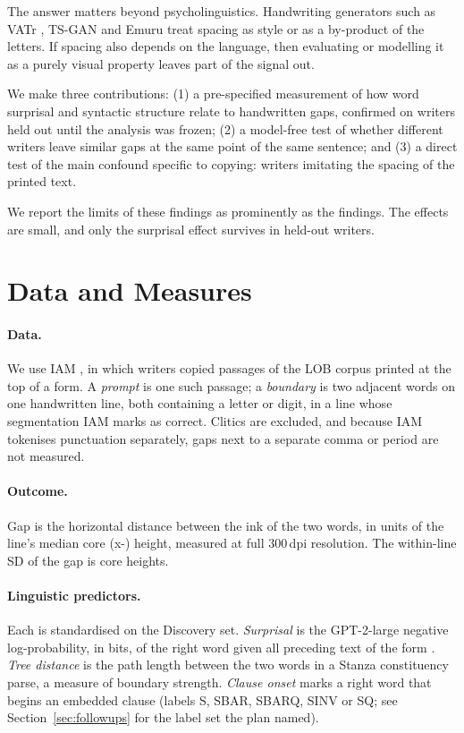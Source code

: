 \documentclass[11pt]{article}
\begin{document}
The answer matters beyond psycholinguistics. Handwriting generators such as VATr \citep{pippi2023}, TS-GAN \citep{davis2020} and Emuru \citep{pippi2025} treat spacing as style or as a by-product of the letters. If spacing also depends on the language, then evaluating or modelling it as a purely visual property leaves part of the signal out.

We make three contributions: (1) a pre-specified measurement of how word surprisal and syntactic structure relate to handwritten gaps, confirmed on writers held out until the analysis was frozen; (2) a model-free test of whether different writers leave similar gaps at the same point of the same sentence; and (3) a direct test of the main confound specific to copying: writers imitating the spacing of the printed text.

We report the limits of these findings as prominently as the findings. The effects are small, and only the surprisal effect survives in held-out writers.

\section{Data and Measures}
\paragraph{Data.} We use IAM \citep{marti2002iam}, in which writers copied passages of the LOB corpus \citep{johansson1978lob} printed at the top of a form. A \emph{prompt} is one such passage; a \emph{boundary} is two adjacent words on one handwritten line, both containing a letter or digit, in a line whose segmentation IAM marks as correct. Clitics are excluded, and because IAM tokenises punctuation separately, gaps next to a separate comma or period are not measured.

\paragraph{Outcome.} Gap is the horizontal distance between the ink of the two words, in units of the line's median core (x-) height, measured at full 300\,dpi resolution. The within-line SD of the gap is \sdGap{} core heights.

\paragraph{Linguistic predictors.} Each is standardised on the Discovery set. \emph{Surprisal} is the GPT-2-large \citep{radford2019} negative log-probability, in bits, of the right word given all preceding text of the form \citep{hale2001,smith2013}. \emph{Tree distance} is the path length between the two words in a Stanza \citep{qi2020} constituency parse, a measure of boundary strength. \emph{Clause onset} marks a right word that begins an embedded clause (labels S, SBAR, SBARQ, SINV or SQ; see Section~\ref{sec:followups} for the label set the plan named).
\end{document}
